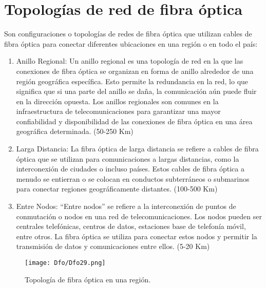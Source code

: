 \documentclass[
	12pt, %
	fleqn, %
	a4paper, %
	oneside, %
]{LegrandOrangeBook}
\begin{document}
\section{Topologías de red de fibra óptica}
Son configuraciones o topologías de redes de fibra óptica que utilizan cables de fibra óptica para conectar diferentes ubicaciones en una región o en todo el país:
\begin{enumerate}
\item Anillo Regional: Un anillo regional es una topología de red en la que las conexiones de fibra óptica se organizan en forma de anillo alrededor de una región geográfica específica. Esto permite la redundancia en la red, lo que significa que si una parte del anillo se daña, la comunicación aún puede fluir en la dirección opuesta. Los anillos regionales son comunes en la infraestructura de telecomunicaciones para garantizar una mayor confiabilidad y disponibilidad de las conexiones de fibra óptica en una área geográfica determinada. (50-250 Km)

\item Larga Distancia: La fibra óptica de larga distancia se refiere a cables de fibra óptica que se utilizan para comunicaciones a largas distancias, como la interconexión de ciudades o incluso países. Estos cables de fibra óptica a menudo se entierran o se colocan en conductos subterráneos o submarinos para conectar regiones geográficamente distantes. (100-500 Km)

\item Entre Nodos: ``Entre nodos'' se refiere a la interconexión de puntos de conmutación o nodos en una red de telecomunicaciones. Los nodos pueden ser centrales telefónicas, centros de datos, estaciones base de telefonía móvil, entre otros. La fibra óptica se utiliza para conectar estos nodos y permitir la transmisión de datos y comunicaciones entre ellos. (5-20 Km)
\end{enumerate}

\begin{figure}[H]
\centering
\texttt{[image: Dfo/Dfo29.png]}
\caption{Topología de fibra óptica en una región.}
\end{figure}
\end{document}
